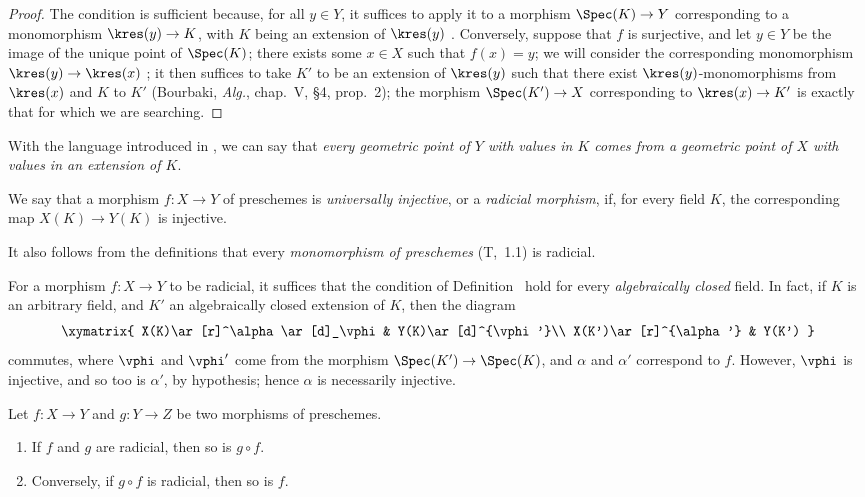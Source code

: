 \begin{proof}
The condition is sufficient because, for all $y\in Y$, it suffices to apply it to a morphism $\Spec(K)\to Y$ corresponding to a monomorphism $\kres(y)\to K$, with $K$ being an extension of $\kres(y)$ .
Conversely, suppose that $f$ is surjective, and let $y\in Y$ be the image of the unique point of $\Spec(K)$; there exists some $x\in X$ such that $f(x)=y$; we will consider the corresponding monomorphism $\kres(y)\to\kres(x)$ ; it then suffices to take $K'$ to be an extension of $\kres(y)$ such that there exist $\kres(y)$-monomorphisms from $\kres(x)$ and $K$ to $K'$ (Bourbaki, \emph{Alg.}, chap.~V, §4, prop.~2); the morphism $\Spec(K')\to X$ corresponding to $\kres(x)\to K'$ is exactly that for which we are searching.
\end{proof}

With the language introduced in , we can say that \emph{every geometric point of $Y$ with values in $K$ comes from a geometric point of $X$ with values in an extension of $K$}.

\begin{definition}[3.5.4]
\label{I.3.5.4}
We say that a morphism $f:X\to Y$ of preschemes is \emph{universally injective}, or a \emph{radicial morphism}, if, for every field $K$, the corresponding map $X(K)\to Y(K)$ is injective.
\end{definition}

It also follows from the definitions that every \emph{monomorphism of preschemes} (T,~1.1) is radicial.

\begin{env}[3.5.5]
\label{I.3.5.5}
For a morphism $f:X\to Y$ to be radicial, it suffices that the condition of Definition~ hold for every \emph{algebraically closed} field.
In fact, if $K$ is an arbitrary field, and $K'$ an algebraically closed extension of $K$, then the diagram
\[
  \xymatrix{
    X(K)\ar[r]^\alpha\ar[d]_\vphi &
    Y(K)\ar[d]^{\vphi'}\\
    X(K')\ar[r]^{\alpha'} &
    Y(K')
  }
\]
commutes, where $\vphi$ and $\vphi'$ come from the morphism $\Spec(K')\to\Spec(K)$, and $\alpha$ and $\alpha'$ correspond to $f$.
However, $\vphi$ is injective, and so too is $\alpha'$, by hypothesis; hence $\alpha$ is necessarily injective.
\end{env}

\begin{proposition}[3.5.6]
\label{I.3.5.6}
Let $f:X\to Y$ and $g:Y\to Z$ be two morphisms of preschemes.
\begin{enumerate}
  \item[{\rm(i)}] If $f$ and $g$ are radicial, then so is $g\circ f$.
  \item[{\rm(ii)}] Conversely, if $g\circ f$ is radicial, then so is $f$.
\end{enumerate}
\end{proposition}


